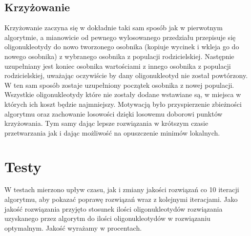 \documentclass{article}
\begin{document}
\subsection{Krzyżowanie}
Krzyżowanie zaczyna się w dokładnie taki sam sposób jak w pierwotnym algorytmie, a mianowicie od pewnego wylosowanego przedziału przepisuje się oligonukleotydy do nowo tworzonego osobnika (kopiuje wycinek i wkleja go do nowego osobnika) z wybranego osobnika z populacji rodzicielskiej. Następnie uzupełniany jest koniec osobnika wartościami z innego osobnika z populacji rodzicielskiej, uważając oczywiście by dany oligonukleotyd nie został powtórzony. W ten sam sposób zostaje uzupełniony początek osobnika z nowej populacji. \\ Wszystkie oligonukleotydy które nie zostały dodane wstawiane są, w miejsca w których ich koszt będzie najmniejszy. Motywacją było przyspierzenie zbieżności algorytmu oraz zachowanie losowości dzięki losowemu doborowi punktów krzyżowania. Tym samy dając lepsze rozwiązania w krótszym czasie przetwarzania jak i dając możliwość na opuszczenie minimów lokalnych.
\section{Testy}
W testach mierzono upływ czasu, jak i zmiany jakości rozwiązań co 10 iteracji algorytmu, aby pokazać poprawę rozwiązań wraz z kolejnymi iteracjami. Jako jakość rozwiązania przyjęto stosunek ilości oligonukleotydów rozwiązania uzyskanego przez algorytm do ilości oligonukleotydów w rozwiązaniu optymalnym. Jakość wyrażamy w procentach.
\end{document}
